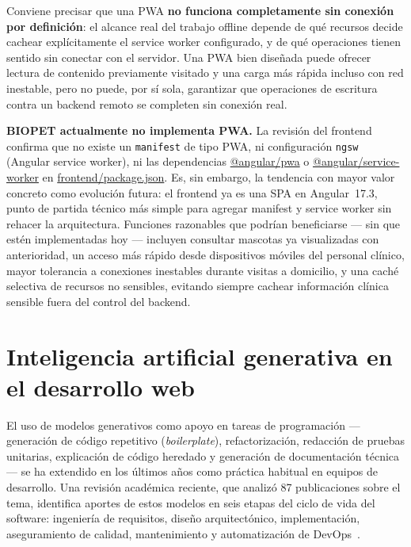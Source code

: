 Conviene precisar que una PWA \textbf{no funciona completamente sin conexi\'on
por definici\'on}: el alcance real del trabajo offline depende de qu\'e
recursos decide cachear expl\'icitamente el service worker configurado, y de
qu\'e operaciones tienen sentido sin conectar con el servidor. Una PWA bien
dise\~nada puede ofrecer lectura de contenido previamente visitado y una
carga m\'as r\'apida incluso con red inestable, pero no puede, por s\'i
sola, garantizar que operaciones de escritura contra un backend remoto se
completen sin conexi\'on real.

\textbf{BIOPET actualmente no implementa PWA.} La revisi\'on del frontend
confirma que no existe un \texttt{manifest} de tipo PWA, ni configuraci\'on
\texttt{ngsw} (Angular service worker), ni las dependencias
\url{@angular/pwa} o \url{@angular/service-worker} en
\url{frontend/package.json}. Es, sin embargo, la tendencia con mayor valor
concreto como evoluci\'on futura: el frontend ya es una SPA en Angular~17.3,
punto de partida t\'ecnico m\'as simple para agregar manifest y service
worker sin rehacer la arquitectura. Funciones razonables que podr\'ian
beneficiarse --- sin que est\'en implementadas hoy --- incluyen consultar
mascotas ya visualizadas con anterioridad, un acceso m\'as r\'apido desde
dispositivos m\'oviles del personal cl\'inico, mayor tolerancia a conexiones
inestables durante visitas a domicilio, y una cach\'e selectiva de recursos
no sensibles, evitando siempre cachear informaci\'on cl\'inica sensible fuera
del control del backend.

\section{Inteligencia artificial generativa en el desarrollo web}
\label{sec:ia-generativa}

El uso de modelos generativos como apoyo en tareas de programaci\'on ---
generaci\'on de c\'odigo repetitivo (\emph{boilerplate}), refactorizaci\'on,
redacci\'on de pruebas unitarias, explicaci\'on de c\'odigo heredado y
generaci\'on de documentaci\'on t\'ecnica --- se ha extendido en los
\'ultimos a\~nos como pr\'actica habitual en equipos de desarrollo. Una
revisi\'on acad\'emica reciente, que analiz\'o 87 publicaciones sobre el
tema, identifica aportes de estos modelos en seis etapas del ciclo de vida
del software: ingenier\'ia de requisitos, dise\~no arquitect\'onico,
implementaci\'on, aseguramiento de calidad, mantenimiento y automatizaci\'on
de DevOps~\parencite{arsha-sreeji-2026}.

